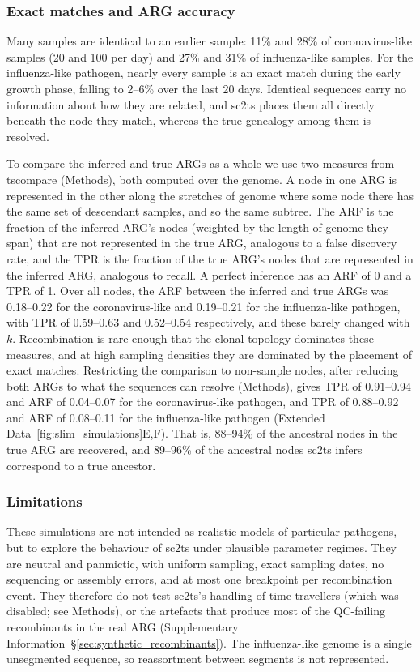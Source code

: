 \documentclass[12pt]{article}
\newcommand{\supref}[1]{Supplementary Information~\S\ref{#1}}
\newcommand{\edref}[1]{Extended Data~\ref{#1}}
\begin{document}
\subsubsection{Exact matches and ARG accuracy}
Many samples are identical to an earlier sample:
11\% and 28\% of coronavirus-like samples (20 and 100 per day)
and 27\% and 31\% of influenza-like samples.
For the influenza-like pathogen, nearly every sample is an exact match
during the early growth phase, falling to 2--6\% over the last 20 days.
Identical sequences carry no information about how they are related,
and sc2ts places them all directly beneath the node they match,
whereas the true genealogy among them is resolved.

To compare the inferred and true ARGs as a whole we use two measures from tscompare
(Methods), both computed over the genome.
A node in one ARG is represented in the other along the stretches of genome
where some node there has the same set of descendant samples,
and so the same subtree.
The ARF is the fraction of the inferred ARG's nodes (weighted by the length of genome
they span) that are not represented in the true ARG,
analogous to a false discovery rate,
and the TPR is the fraction of the true ARG's nodes that are represented
in the inferred ARG, analogous to recall.
A perfect inference has an ARF of 0 and a TPR of 1.
Over all nodes, the ARF between the inferred and true ARGs was 0.18--0.22
for the coronavirus-like and 0.19--0.21 for the influenza-like pathogen,
with TPR of 0.59--0.63 and 0.52--0.54 respectively,
and these barely changed with $k$.
Recombination is rare enough that the clonal topology dominates these measures,
and at high sampling densities they are dominated by the placement
of exact matches.
Restricting the comparison to non-sample nodes, after reducing
both ARGs to what the sequences can resolve (Methods),
gives TPR of 0.91--0.94 and ARF of 0.04--0.07 for the coronavirus-like pathogen,
and TPR of 0.88--0.92 and ARF of 0.08--0.11 for the influenza-like pathogen
(\edref{fig:slim_simulations}E,F).
That is, 88--94\% of the ancestral nodes in the true ARG are recovered,
and 89--96\% of the ancestral nodes sc2ts infers correspond to a true ancestor.

\subsubsection{Limitations}
These simulations are not intended as realistic models of particular pathogens,
but to explore the behaviour of sc2ts under plausible parameter regimes.
They are neutral and panmictic,
with uniform sampling, exact sampling dates,
no sequencing or assembly errors,
and at most one breakpoint per recombination event.
They therefore do not test sc2ts's handling of time travellers
(which was disabled; see Methods),
or the artefacts that produce most of the QC-failing recombinants in the
real ARG (\supref{sec:synthetic_recombinants}).
The influenza-like genome is a single unsegmented sequence,
so reassortment between segments is not represented.
\end{document}
